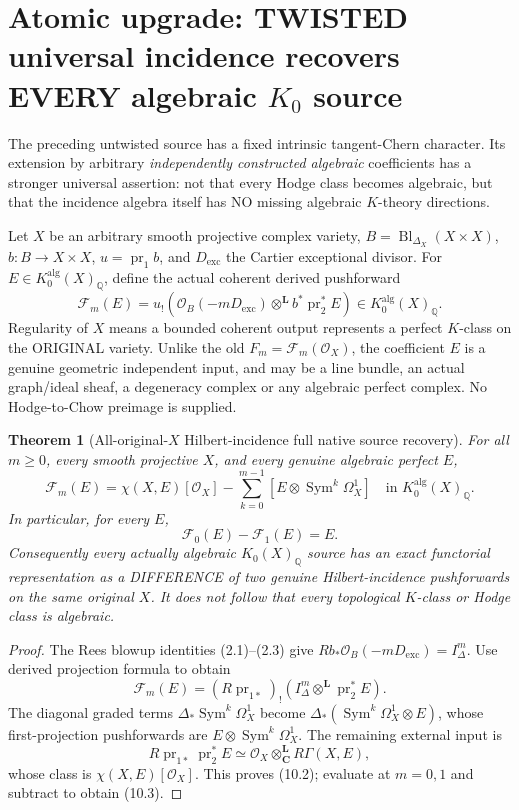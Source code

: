 \documentclass[11pt]{article}
\newcommand{\Q}{\mathbb Q}
\newcommand{\Sym}{\operatorname{Sym}}
\newtheorem{theorem}{Theorem}[section]
\begin{document}
\section{Atomic upgrade: TWISTED universal incidence recovers EVERY algebraic \(K_0\) source}
The preceding untwisted source has a fixed intrinsic tangent-Chern
character. Its extension by arbitrary \emph{independently constructed
algebraic} coefficients has a stronger universal assertion: not that
every Hodge class becomes algebraic, but that the incidence algebra
itself has NO missing algebraic \(K\)-theory directions.

Let \(X\) be an arbitrary smooth projective complex variety,
\(B=\operatorname{Bl}_{\Delta_X}(X\times X)\),
\(b:B\to X\times X\), \(u=\operatorname{pr}_1b\),
and \(D_{\mathrm{exc}}\) the Cartier exceptional divisor.
For \(E\in K_0^{\mathrm{alg}}(X)_\Q\), define the actual
coherent derived pushforward
\[
 {\mathcal F}_{m}(E)
 =u_!\left(
 \mathcal O_B(-mD_{\mathrm{exc}})
 \otimes^{\mathbf L} b^*\operatorname{pr}_2^*E
       \right)\in K_0^{\mathrm{alg}}(X)_\Q.
                                                               \tag{10.1}
\]
Regularity of \(X\) means a bounded coherent output represents
a perfect \(K\)-class on the ORIGINAL variety. Unlike the old
\(F_m={\mathcal F}_m(\mathcal O_X)\), the coefficient \(E\)
is a genuine geometric independent input, and may be a line bundle,
an actual graph/ideal sheaf, a degeneracy complex or any algebraic
perfect complex. No Hodge-to-Chow preimage is supplied.

\begin{theorem}[All-original-\(X\) Hilbert-incidence full native source recovery]
For all \(m\ge0\), every smooth projective \(X\), and every
genuine algebraic perfect \(E\),
\[
 \boxed{
 {\mathcal F}_m(E)
  =\chi(X,E)[\mathcal O_X]
    -\sum_{k=0}^{m-1}
       [E\otimes\Sym^k\Omega_X^1]
       \quad\text{in }K_0^{\mathrm{alg}}(X)_\Q .
 }                                                       \tag{10.2}
\]
In particular, for every \(E\),
\[
 \boxed{\mathcal F_0(E)-\mathcal F_1(E)=E.}          \tag{10.3}
\]
Consequently \emph{every actually algebraic \(K_0(X)_\Q\)
source} has an exact functorial representation as a DIFFERENCE
of two genuine Hilbert-incidence pushforwards on the same
original \(X\). It does not follow that every topological
\(K\)-class or Hodge class is algebraic.
\end{theorem}
\begin{proof}
The Rees blowup identities (2.1)--(2.3) give
\(Rb_*\mathcal O_B(-mD_{\mathrm{exc}})=I_\Delta^m\).
Use derived projection formula to obtain
\[
 \mathcal F_m(E)=
 (R\operatorname{pr}_{1*})_!
    (I_\Delta^m\otimes^{\mathbf L}\operatorname{pr}_2^*E).
\]
The diagonal graded terms
\(\Delta_*\Sym^k\Omega_X^1\) become
\(\Delta_*(\Sym^k\Omega_X^1\otimes E)\), whose
first-projection pushforwards are
\(E\otimes\Sym^k\Omega_X^1\).
The remaining external input is
\[
 R\operatorname{pr}_{1*}\operatorname{pr}_2^*E
 \simeq\mathcal O_X\otimes^{\mathbf L}_{\mathbf C}
              R\Gamma(X,E),
\]
whose class is \(\chi(X,E)[\mathcal O_X]\).
This proves (10.2); evaluate at \(m=0,1\)
and subtract to obtain (10.3).
\end{proof}
\end{document}
